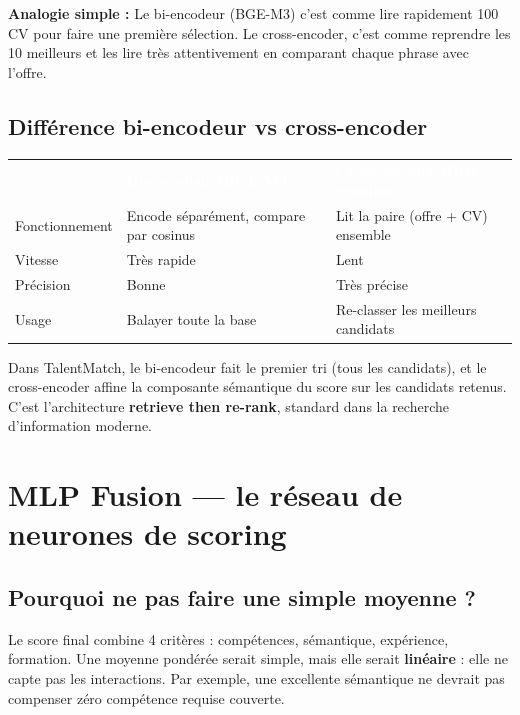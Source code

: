 \documentclass[12pt,a4paper]{article}
\newenvironment{simplification}{%
  \def\FrameCommand{\fboxsep=8pt\colorbox{green!10}}%
  \MakeFramed{\advance\hsize-\width \FrameRestore}%
  \vspace{-4pt}%
}{\endMakeFramed}
\newcommand{\concept}[1]{\textbf{\color{bleu}#1}}
\begin{document}
\begin{simplification}
\textbf{Analogie simple :}
Le bi-encodeur (BGE-M3) c'est comme lire rapidement 100 CV pour faire une première sélection. Le cross-encoder, c'est comme reprendre les 10 meilleurs et les lire très attentivement en comparant chaque phrase avec l'offre.
\end{simplification}

\subsection{Différence bi-encodeur vs cross-encoder}

\begin{tabularx}{\textwidth}{p{3.5cm} X X}
\rowcolor{bleu}
\textcolor{white}{\textbf{}} & \textcolor{white}{\textbf{Bi-encodeur (BGE-M3)}} & \textcolor{white}{\textbf{Cross-encoder (BGE-reranker)}} \\
Fonctionnement & Encode séparément, compare par cosinus & Lit la paire (offre + CV) ensemble \\
\rowcolor{bleulight}
Vitesse & Très rapide & Lent \\
Précision & Bonne & Très précise \\
\rowcolor{bleulight}
Usage & Balayer toute la base & Re-classer les meilleurs candidats \\
\bottomrule
\end{tabularx}

\medskip

Dans TalentMatch, le bi-encodeur fait le premier tri (tous les candidats), et le cross-encoder affine la composante sémantique du score sur les candidats retenus. C'est l'architecture \concept{retrieve then re-rank}, standard dans la recherche d'information moderne.

\newpage

\section{MLP Fusion — le réseau de neurones de scoring}

\subsection{Pourquoi ne pas faire une simple moyenne ?}

Le score final combine 4 critères : compétences, sémantique, expérience, formation. Une moyenne pondérée serait simple, mais elle serait \textbf{linéaire} : elle ne capte pas les interactions. Par exemple, une excellente sémantique ne devrait pas compenser zéro compétence requise couverte.
\end{document}
